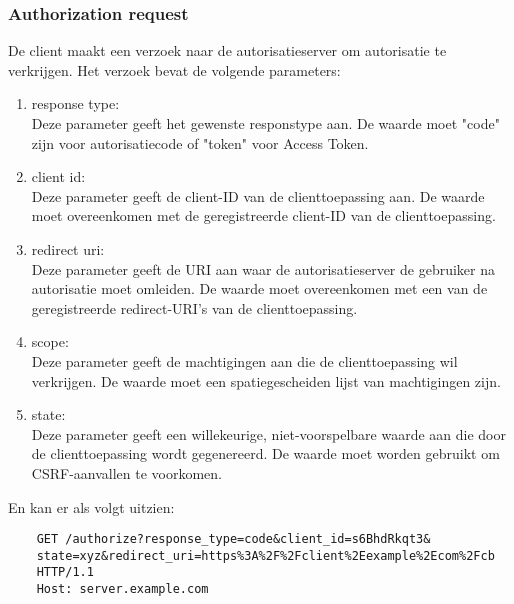 \subsubsection{Authorization request}%
\label{subsubsec:authorization-request}
De client maakt een verzoek naar de autorisatieserver om autorisatie te verkrijgen. Het verzoek bevat de volgende parameters:
\begin{enumerate}[label=\textbf{-}]
    \item response type: \\
    Deze parameter geeft het gewenste responstype aan. De waarde moet "code" zijn voor autorisatiecode of "token" voor Access Token.
  
    \item client id: \\
    Deze parameter geeft de client-ID van de clienttoepassing aan. De waarde moet overeenkomen met de geregistreerde client-ID van de clienttoepassing.
  
    \item redirect uri: \\
    Deze parameter geeft de URI aan waar de autorisatieserver de gebruiker na autorisatie moet omleiden. De waarde moet overeenkomen met een van de geregistreerde redirect-URI's van de clienttoepassing.
  
    \item scope: \\
    Deze parameter geeft de machtigingen aan die de clienttoepassing wil verkrijgen. De waarde moet een spatiegescheiden lijst van machtigingen zijn.
  
    \item state: \\
    Deze parameter geeft een willekeurige, niet-voorspelbare waarde aan die door de clienttoepassing wordt gegenereerd. De waarde moet worden gebruikt om CSRF-aanvallen te voorkomen.
  \end{enumerate}
  En kan er als volgt uitzien:
  \begin{verbatim}
    GET /authorize?response_type=code&client_id=s6BhdRkqt3&
    state=xyz&redirect_uri=https%3A%2F%2Fclient%2Eexample%2Ecom%2Fcb
    HTTP/1.1
    Host: server.example.com
  \end{verbatim}
    

